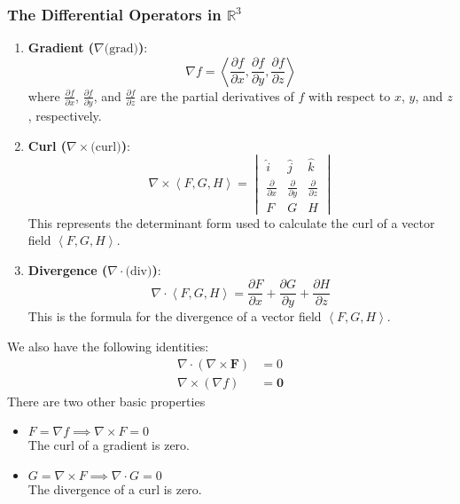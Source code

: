 \documentclass[a4paper]{article}
\begin{document}
\subsubsection{The Differential Operators in $\mathbb{R}^3$}

\begin{enumerate}
    \item \textbf{Gradient (\(\nabla \text{(grad)}\))}:
    \[
    \nabla f = \left< \frac{\partial f}{\partial x}, \frac{\partial f}{\partial y}, \frac{\partial f}{\partial z} \right>
    \]
    where \(\frac{\partial f}{\partial x}\), \(\frac{\partial f}{\partial y}\), and \(\frac{\partial f}{\partial z}\) are the partial derivatives of \(f\) with respect to \(x\), \(y\), and \(z\), respectively.

    \item \textbf{Curl (\(\nabla \times \text{(curl)}\))}:
    \[
    \nabla \times \left< F, G, H \right> = \begin{vmatrix}
    \hat{i} & \hat{j} & \hat{k} \\
    \frac{\partial}{\partial x} & \frac{\partial}{\partial y} & \frac{\partial}{\partial z} \\
    F & G & H
    \end{vmatrix}
    \]
    This represents the determinant form used to calculate the curl of a vector field \(\left< F, G, H \right>\).

    \item \textbf{Divergence (\(\nabla \cdot \text{(div)}\))}:
    \[
    \nabla \cdot \left< F, G, H \right> = \frac{\partial F}{\partial x} + \frac{\partial G}{\partial y} + \frac{\partial H}{\partial z}
    \]
    This is the formula for the divergence of a vector field \(\left< F, G, H \right>\).
\end{enumerate}
We also have the following identities:
\begin{align*}
    \nabla \cdot (\nabla \times \mathbf{F}) &= 0 \\
    \nabla \times (\nabla f) &= \mathbf{0}
\end{align*}
There are two other basic properties
\begin{itemize}
    \item $F = \nabla f \implies \nabla \times F = 0$\\
    The curl of a gradient is zero.
    \item $G = \nabla \times F \implies \nabla \cdot G = 0$\\
    The divergence of a curl is zero.
\end{itemize}
\end{document}
